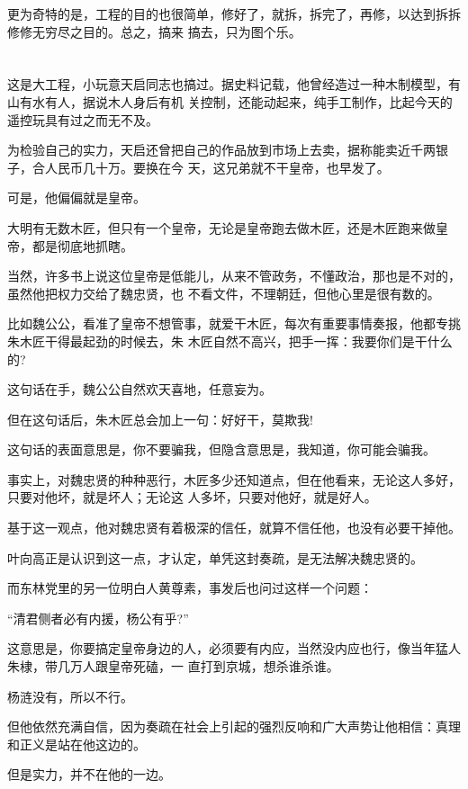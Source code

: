 \documentclass[11pt,a4paper,onecolumn]{article}
\begin{document}
更为奇特的是，工程的目的也很简单，修好了，就拆，拆完了，再修，以达到拆拆修修无穷尽之目的。总之，搞来
搞去，只为图个乐。

\section[\thesection]{}

这是大工程，小玩意天启同志也搞过。据史料记载，他曾经造过一种木制模型，有山有水有人，据说木人身后有机
关控制，还能动起来，纯手工制作，比起今天的遥控玩具有过之而无不及。

为检验自己的实力，天启还曾把自己的作品放到市场上去卖，据称能卖近千两银子，合人民币几十万。要换在今
天，这兄弟就不干皇帝，也早发了。

可是，他偏偏就是皇帝。

大明有无数木匠，但只有一个皇帝，无论是皇帝跑去做木匠，还是木匠跑来做皇帝，都是彻底地抓瞎。

当然，许多书上说这位皇帝是低能儿，从来不管政务，不懂政治，那也是不对的，虽然他把权力交给了魏忠贤，也
不看文件，不理朝廷，但他心里是很有数的。

比如魏公公，看准了皇帝不想管事，就爱干木匠，每次有重要事情奏报，他都专挑朱木匠干得最起劲的时候去，朱
木匠自然不高兴，把手一挥：我要你们是干什么的?

这句话在手，魏公公自然欢天喜地，任意妄为。

但在这句话后，朱木匠总会加上一句：好好干，莫欺我!

这句话的表面意思是，你不要骗我，但隐含意思是，我知道，你可能会骗我。

事实上，对魏忠贤的种种恶行，木匠多少还知道点，但在他看来，无论这人多好，只要对他坏，就是坏人；无论这
人多坏，只要对他好，就是好人。

基于这一观点，他对魏忠贤有着极深的信任，就算不信任他，也没有必要干掉他。

叶向高正是认识到这一点，才认定，单凭这封奏疏，是无法解决魏忠贤的。

而东林党里的另一位明白人黄尊素，事发后也问过这样一个问题：

``清君侧者必有内援，杨公有乎?''

这意思是，你要搞定皇帝身边的人，必须要有内应，当然没内应也行，像当年猛人朱棣，带几万人跟皇帝死磕，一
直打到京城，想杀谁杀谁。

杨涟没有，所以不行。

但他依然充满自信，因为奏疏在社会上引起的强烈反响和广大声势让他相信：真理和正义是站在他这边的。

但是实力，并不在他的一边。
\end{document}
